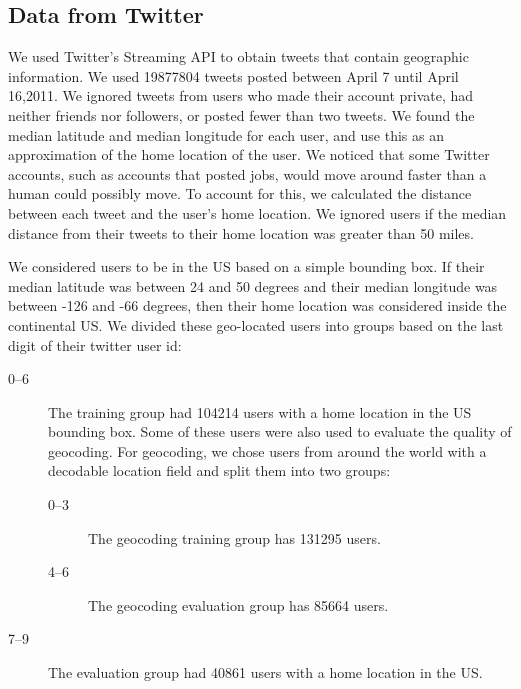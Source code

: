 \documentclass{sig-alternate}
\begin{document}
\subsection{Data from Twitter}
We used Twitter's Streaming API to obtain tweets that contain geographic information.
We used 19877804 tweets posted between April 7 until April 16,2011.
We ignored tweets from users who made their account private, had neither friends nor followers, or posted fewer than two tweets.
We found the median latitude and median longitude for each user, and use this as an approximation of the home location of the user.
We noticed that some Twitter accounts, such as accounts that posted jobs, would move around faster than a human could possibly move. To account for this, we calculated the distance between each tweet and the user's home location. We ignored users if the median distance from their tweets to their home location was greater than 50 miles.

We considered users to be in the US based on a simple bounding box.  If their median latitude was between 24 and 50 degrees and their median longitude was between -126 and -66 degrees, then their home location was considered inside the continental US.
We divided these geo-located users into groups based on the last digit of their twitter user id:
\begin{description}
\item[0--6] The training group had 104214 users with a home location in the US bounding box. Some of these users were also used to evaluate the quality of geocoding. For geocoding, we chose users from around the world with a decodable location field and split them into two groups:
\begin{description}
\item[0--3] The geocoding training group has 131295 users.
\item[4--6] The geocoding evaluation group has 85664 users.
\end{description}
\item[7--9] The evaluation group had 40861 users with a home location in the US.
\end{description}
\end{document}

